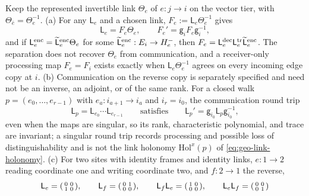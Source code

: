Keep the represented invertible link \(\Theta_e\) of \(e:j\to i\) on the vector
tier, with \(\Theta_{\bar e}=\Theta_e^{-1}\). (a) For any \(\mathsf L_e\) and a
chosen link, \(F_e:=\mathsf L_e\Theta_e^{-1}\) gives
\begin{equation}
\mathsf L_e=F_e\Theta_e,
\qquad
F_e'=\mathsf g_iF_e\mathsf g_i^{-1},
\label{eq:geo-selective-processing-connection}
\end{equation}
and if \(\mathsf L^{\rm enc}_e=\widetilde{\mathsf L}^{\rm enc}_e\Theta_e\) for
some \(\widetilde{\mathsf L}^{\rm enc}_e:E_i\to H_e^-\), then
\(F_e=\mathsf L^{\rm dec}_e\mathsf L^{\rm tr}_e\widetilde{\mathsf L}^{\rm enc}_e\).
The separation does not recover \(\Theta_e\) from communication, and a
receiver-only processing map \(F_e=F_i\) exists exactly when
\(\mathsf L_e\Theta_e^{-1}\) agrees on every incoming edge copy at \(i\). (b)
Communication on the reverse copy is separately specified and need not be an
inverse, an adjoint, or of the same rank. For a closed walk
\(p=(e_0,\ldots,e_{r-1})\) with \(e_a:i_{a+1}\to i_a\) and \(i_r=i_0\), the
communication round trip
\begin{equation}
\mathsf L_p=\mathsf L_{e_0}\cdots\mathsf L_{e_{r-1}}
\qquad\text{satisfies}\qquad
\mathsf L_p'=\mathsf g_{i_0}\mathsf L_p\mathsf g_{i_0}^{-1},
\label{eq:geo-selective-loop}
\end{equation}
even when the maps are singular, so its rank, characteristic polynomial, and
trace are invariant; a singular round trip records processing and possible
loss of distinguishability and is not the link holonomy
\(\mathrm{Hol}^x(p)\) of \eqref{eq:geo-link-holonomy}. (c) For two sites with
identity frames and identity links, \(e:1\to2\) reading coordinate one and
writing coordinate two, and \(f:2\to1\) the reverse,
\begin{equation}
\mathsf L_e=\begin{psmallmatrix}0&0\\1&0\end{psmallmatrix},\qquad
\mathsf L_f=\begin{psmallmatrix}0&1\\0&0\end{psmallmatrix},\qquad
\mathsf L_f\mathsf L_e=\begin{psmallmatrix}1&0\\0&0\end{psmallmatrix},\qquad
\mathsf L_e\mathsf L_f=\begin{psmallmatrix}0&0\\0&1\end{psmallmatrix}
\label{eq:geo-selective-two-site-example}
\end{equation}
